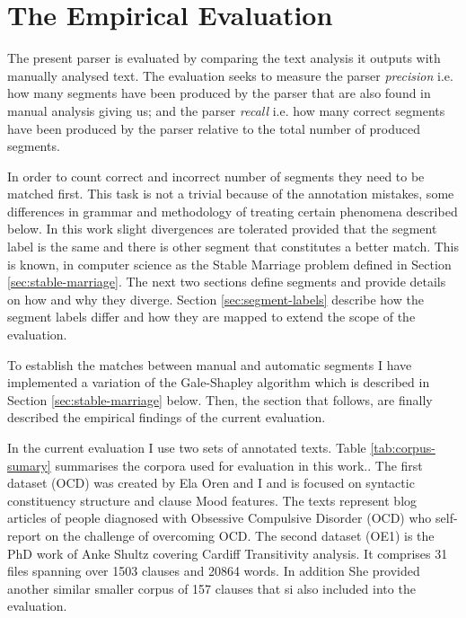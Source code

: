\chapter{The Empirical Evaluation}
\label{ch:evaluation}

The present parser is evaluated by comparing the text analysis it outputs with manually analysed text. The evaluation seeks to measure the parser \textit{precision} i.e. how many segments have been produced by the parser that are also found in manual analysis giving us; and the parser \textit{recall} i.e. how many correct segments have been produced by the parser relative to the total number of produced segments.

In order to count correct and incorrect number of segments they need to be matched first. This task is not a trivial because of the annotation  mistakes, some differences in grammar and methodology of treating certain phenomena described below. In this work slight divergences are tolerated provided that the segment label is the same and there is other segment that constitutes a better match. This is known, in computer science as the Stable Marriage problem defined in Section \ref{sec:stable-marriage}. The next two sections define segments and provide details on how and why they diverge. Section \ref{sec:segment-labels} describe how the segment labels differ and how they are mapped to extend the scope of the evaluation. 

To establish the matches between manual and automatic segments I have implemented a variation of the Gale-Shapley algorithm \citep{Gale1962} which is described in Section \ref{sec:stable-marriage} below. Then, the section that follows, are finally described the empirical findings of the current evaluation. 

In the current evaluation I use two sets of annotated texts. Table \ref{tab:corpus-sumary} summarises the corpora used for evaluation in this work.. The first dataset (OCD) was created by Ela Oren and I and is focused on syntactic constituency structure and clause Mood features. The texts represent blog articles of people diagnosed with Obsessive Compulsive Disorder (OCD) who self-report on the challenge of overcoming OCD. 
The second dataset (OE1) is the PhD work of Anke Shultz covering Cardiff Transitivity analysis. It comprises 31 files spanning over 1503 clauses and 20864 words. In addition She provided another similar smaller corpus of 157 clauses that si also included into the evaluation. 

